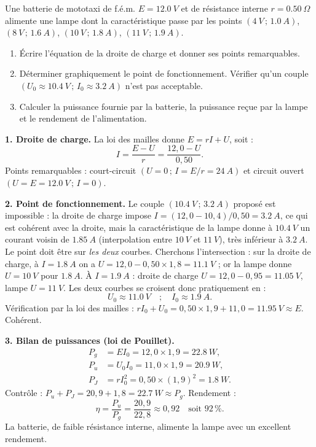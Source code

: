 \documentclass[11pt]{article}
\newcounter{popsec}
\newcounter{popsub}
\newcommand{\courssub}[1]{%
  \stepcounter{popsub}%
  \par\vspace{9pt}\noindent{\popxbold\fontsize{11.5}{13}\selectfont\color{popink}{\color{poporange}\thepopsec.\thepopsub}\hspace{6pt}#1}\par\nopagebreak\vspace{4pt}
}
\begin{document}
\courssub{Exercice de synthèse résolu}

\begin{exoresolu}
Une batterie de mototaxi de f.é.m. $E = \SI{12,0}{V}$ et de résistance interne $r = \SI{0,50}{\Omega}$ alimente une lampe dont la caractéristique passe par les points $(\SI{4}{V}\,;\,\SI{1,0}{A})$, $(\SI{8}{V}\,;\,\SI{1,6}{A})$, $(\SI{10}{V}\,;\,\SI{1,8}{A})$, $(\SI{11}{V}\,;\,\SI{1,9}{A})$.
\begin{enumerate}
\item Écrire l'équation de la droite de charge et donner ses points remarquables.
\item Déterminer graphiquement le point de fonctionnement. Vérifier qu'un couple $(U_0 \approx \SI{10,4}{V}\,;\, I_0 \approx \SI{3,2}{A})$ n'est pas acceptable.
\item Calculer la puissance fournie par la batterie, la puissance reçue par la lampe et le rendement de l'alimentation.
\end{enumerate}
\tcblower
\textbf{1. Droite de charge.} La loi des mailles donne $E = rI + U$, soit :
\[ I = \frac{E - U}{r} = \frac{12,0 - U}{0,50}. \]
Points remarquables : court-circuit $(U = 0\,;\,I = E/r = \SI{24}{A})$ et circuit ouvert $(U = E = \SI{12,0}{V}\,;\,I = 0)$.

\textbf{2. Point de fonctionnement.} Le couple $(\SI{10,4}{V}\,;\,\SI{3,2}{A})$ proposé est impossible : la droite de charge impose $I = (12,0 - 10,4)/0,50 = \SI{3,2}{A}$, ce qui est cohérent avec la droite, mais la caractéristique de la lampe donne à $\SI{10,4}{V}$ un courant voisin de $\SI{1,85}{A}$ (interpolation entre $\SI{10}{V}$ et $\SI{11}{V}$), très inférieur à $\SI{3,2}{A}$. Le point doit être sur \emph{les deux} courbes. Cherchons l'intersection : sur la droite de charge, à $I = \SI{1,8}{A}$ on a $U = 12,0 - 0,50 \times 1,8 = \SI{11,1}{V}$ ; or la lampe donne $U = \SI{10}{V}$ pour $\SI{1,8}{A}$. À $I = \SI{1,9}{A}$ : droite de charge $U = 12,0 - 0,95 = \SI{11,05}{V}$, lampe $U = \SI{11}{V}$. Les deux courbes se croisent donc pratiquement en :
\[ \boxed{U_0 \approx \SI{11,0}{V} \quad ; \quad I_0 \approx \SI{1,9}{A}}. \]
Vérification par la loi des mailles : $r I_0 + U_0 = 0,50 \times 1,9 + 11,0 = \SI{11,95}{V} \approx E$. Cohérent.

\textbf{3. Bilan de puissances (loi de Pouillet).}
\begin{align*}
P_g &= E I_0 = 12,0 \times 1,9 = \SI{22,8}{W}, \\
P_u &= U_0 I_0 = 11,0 \times 1,9 = \SI{20,9}{W}, \\
P_J &= r I_0^2 = 0,50 \times (1,9)^2 = \SI{1,8}{W}.
\end{align*}
Contrôle : $P_u + P_J = 20,9 + 1,8 = \SI{22,7}{W} \approx P_g$. Rendement :
\[ \eta = \frac{P_u}{P_g} = \frac{20,9}{22,8} \approx 0,92 \quad \text{soit } 92\,\%. \]
La batterie, de faible résistance interne, alimente la lampe avec un excellent rendement.
\end{exoresolu}
\end{document}
